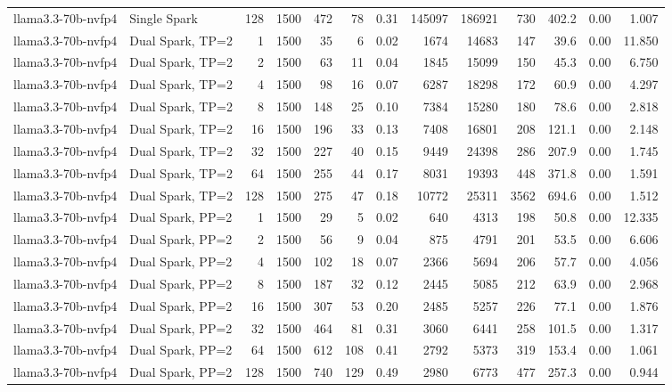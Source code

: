 \begin{tabular}{l l r r r r r r r r r r r}
llama3.3-70b-nvfp4 & Single Spark & 128 & 1500 & 472 & 78 & 0.31 & 145097 & 186921 & 730 & 402.2 & 0.00 & 1.007 \\
\addlinespace
llama3.3-70b-nvfp4 & Dual Spark, TP=2 & 1 & 1500 & 35\rlap{$^\dagger$} & 6 & 0.02 & 1674 & 14683 & 147 & 39.6 & 0.00 & 11.850 \\
llama3.3-70b-nvfp4 & Dual Spark, TP=2 & 2 & 1500 & 63\rlap{$^\dagger$} & 11 & 0.04 & 1845 & 15099 & 150 & 45.3 & 0.00 & 6.750 \\
llama3.3-70b-nvfp4 & Dual Spark, TP=2 & 4 & 1500 & 98\rlap{$^\dagger$} & 16 & 0.07 & 6287 & 18298 & 172 & 60.9 & 0.00 & 4.297 \\
llama3.3-70b-nvfp4 & Dual Spark, TP=2 & 8 & 1500 & 148 & 25 & 0.10 & 7384 & 15280 & 180 & 78.6 & 0.00 & 2.818 \\
llama3.3-70b-nvfp4 & Dual Spark, TP=2 & 16 & 1500 & 196 & 33 & 0.13 & 7408 & 16801 & 208 & 121.1 & 0.00 & 2.148 \\
llama3.3-70b-nvfp4 & Dual Spark, TP=2 & 32 & 1500 & 227 & 40 & 0.15 & 9449 & 24398 & 286 & 207.9 & 0.00 & 1.745 \\
llama3.3-70b-nvfp4 & Dual Spark, TP=2 & 64 & 1500 & 255 & 44 & 0.17 & 8031 & 19393 & 448 & 371.8 & 0.00 & 1.591 \\
llama3.3-70b-nvfp4 & Dual Spark, TP=2 & 128 & 1500 & 275 & 47 & 0.18 & 10772 & 25311 & 3562 & 694.6 & 0.00 & 1.512 \\
\addlinespace
llama3.3-70b-nvfp4 & Dual Spark, PP=2 & 1 & 1500 & 29\rlap{$^\dagger$} & 5 & 0.02 & 640 & 4313 & 198 & 50.8 & 0.00 & 12.335 \\
llama3.3-70b-nvfp4 & Dual Spark, PP=2 & 2 & 1500 & 56\rlap{$^\dagger$} & 9 & 0.04 & 875 & 4791 & 201 & 53.5 & 0.00 & 6.606 \\
llama3.3-70b-nvfp4 & Dual Spark, PP=2 & 4 & 1500 & 102 & 18 & 0.07 & 2366 & 5694 & 206 & 57.7 & 0.00 & 4.056 \\
llama3.3-70b-nvfp4 & Dual Spark, PP=2 & 8 & 1500 & 187 & 32 & 0.12 & 2445 & 5085 & 212 & 63.9 & 0.00 & 2.968 \\
llama3.3-70b-nvfp4 & Dual Spark, PP=2 & 16 & 1500 & 307 & 53 & 0.20 & 2485 & 5257 & 226 & 77.1 & 0.00 & 1.876 \\
llama3.3-70b-nvfp4 & Dual Spark, PP=2 & 32 & 1500 & 464 & 81 & 0.31 & 3060 & 6441 & 258 & 101.5 & 0.00 & 1.317 \\
llama3.3-70b-nvfp4 & Dual Spark, PP=2 & 64 & 1500 & 612 & 108 & 0.41 & 2792 & 5373 & 319 & 153.4 & 0.00 & 1.061 \\
llama3.3-70b-nvfp4 & Dual Spark, PP=2 & 128 & 1500 & 740 & 129 & 0.49 & 2980 & 6773 & 477 & 257.3 & 0.00 & 0.944 \\

\end{tabular}
